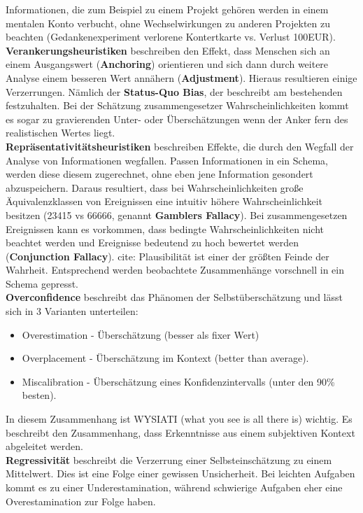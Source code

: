 Informationen, die zum Beispiel zu einem Projekt gehören werden in
einem mentalen Konto verbucht, ohne Wechselwirkungen zu anderen Projekten
zu beachten (Gedankenexperiment verlorene Kontertkarte vs. Verlust 100EUR). \\
\textbf{Verankerungsheuristiken} beschreiben den Effekt, dass Menschen sich
an einem Ausgangswert (\textbf{Anchoring}) orientieren und sich dann durch weitere Analyse einem
besseren Wert annähern (\textbf{Adjustment}). Hieraus resultieren
einige Verzerrungen. Nämlich der \textbf{Status-Quo Bias}, der beschreibt am bestehenden
festzuhalten. Bei der Schätzung zusammengesetzer Wahrscheinlichkeiten
kommt es sogar zu gravierenden Unter- oder Überschätzungen wenn der Anker fern
des realistischen Wertes liegt. \\
\textbf{Repräsentativitätsheuristiken} beschreiben Effekte, die durch den
Wegfall der Analyse von Informationen wegfallen. Passen Informationen
in ein Schema, werden diese diesem zugerechnet, ohne eben jene Information
gesondert abzuspeichern. Daraus resultiert, dass bei Wahrscheinlichkeiten
große Äquivalenzklassen von Ereignissen eine intuitiv höhere
Wahrscheinlichkeit besitzen (23415 vs 66666, genannt \textbf{Gamblers
Fallacy}). Bei zusammengesetzen
Ereignissen kann es vorkommen, dass bedingte Wahrscheinlichkeiten nicht
beachtet werden und Ereignisse bedeutend zu hoch bewertet werden
(\textbf{Conjunction Fallacy}). cite: Plausibilität ist einer der
größten Feinde der Wahrheit. Entsprechend werden beobachtete Zusammenhänge
vorschnell in ein Schema gepresst. \\

\textbf{Overconfidence} beschreibt das Phänomen der Selbstüberschätzung
und lässt sich in 3 Varianten unterteilen:
\begin{itemize}
    \item Overestimation - Überschätzung (besser als fixer Wert)
    \item Overplacement - Überschätzung im Kontext (better than average).
    \item Miscalibration - Überschätzung eines Konfidenzintervalls
        (unter den 90\% besten).
\end{itemize}
In diesem Zusammenhang ist WYSIATI (what you see is all there is) wichtig.
Es beschreibt den Zusammenhang, dass Erkenntnisse aus einem subjektiven
Kontext abgeleitet werden.\\
\textbf{Regressivität} beschreibt die Verzerrung einer Selbsteinschätzung
zu einem Mittelwert. Dies ist eine Folge einer gewissen Unsicherheit.
Bei leichten Aufgaben kommt es zu einer Underestamination, während schwierige
Aufgaben eher eine Overestamination zur Folge haben.


